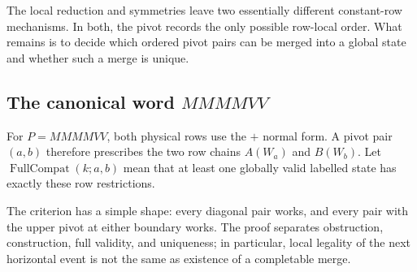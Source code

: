 \documentclass[11pt]{article}
\theoremstyle{definition}
\theoremstyle{remark}
\begin{document}
The local reduction and symmetries leave two essentially different
constant-row mechanisms. In both, the pivot records the only possible
row-local order. What remains is to decide which ordered pivot pairs can
be merged into a global state and whether such a merge is unique.

\subsection{\texorpdfstring{The canonical word
\(MMMMVV\)}{The canonical word MMMMVV}}\label{the-canonical-word-mmmmvv}

For \(P=MMMMVV\), both physical rows use the \(+\) normal form. A pivot
pair \((a,b)\) therefore prescribes the two row chains \(A(W_a)\) and
\(B(W_b)\). Let \(\operatorname{FullCompat}(k;a,b)\) mean that at least
one globally valid labelled state has exactly these row restrictions.

The criterion has a simple shape: every diagonal pair works, and every
pair with the upper pivot at either boundary works. The proof separates
obstruction, construction, full validity, and uniqueness; in particular,
local legality of the next horizontal event is not the same as existence
of a completable merge.
\end{document}
